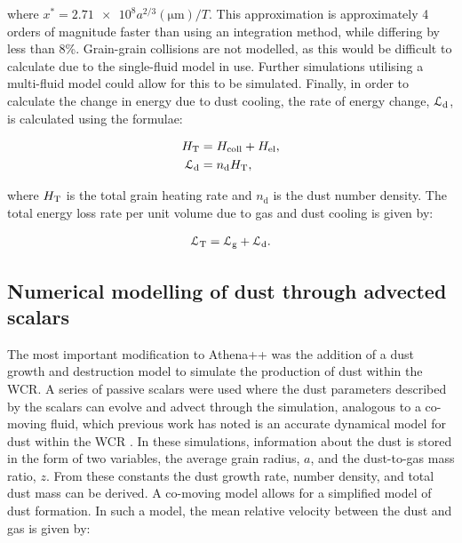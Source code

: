 \noindent
where $x^* = \num{2.71e8} a^{2/3} (\si{\micro\metre})/T$.
This approximation is approximately 4 orders of magnitude faster than using an integration method, while differing by less than 8\%.
Grain-grain collisions are not modelled, as this would be difficult to calculate due to the single-fluid model in use.
Further simulations utilising a multi-fluid model could allow for this to be simulated.
Finally, in order to calculate the change in energy due to dust cooling, the rate of energy change, $\mathcal{L}_\text{d}$, is calculated using the formulae:

\begin{subequations}
  \label{eq:transparency-approximation}
  \begin{align}
    H_\text{T}           & = H_\text{coll} + H_\text{el} , \\
    \mathcal{L}_\text{d} & = n_\text{d} H_\text{T} ,
  \end{align}
\end{subequations}

\noindent
where $H_\text{T}$ is the total grain heating rate
and $n_\text{d}$ is the dust number density.
The total energy loss rate per unit volume due to gas and dust cooling is given by:

\begin{equation}
	\mathcal{L}_\text{T} = \mathcal{L}_\text{g} + \mathcal{L}_\text{d} .
\end{equation}


\subsection{Numerical modelling of dust through advected scalars}

The most important modification to Athena++ was the addition of a dust growth and destruction model to simulate the production of dust within the WCR.
A series of passive scalars were used where the dust parameters described by the scalars can evolve and advect through the simulation, analogous to a co-moving fluid, which previous work has noted is an accurate dynamical model for dust within the WCR \parencite{hendrix_pinwheels_2016}.
In these simulations, information about the dust is stored in the form of two variables, the average grain radius, $a$, and the dust-to-gas mass ratio, $z$.
From these constants the dust growth rate, number density, and total dust mass can be derived.
A co-moving model allows for a simplified model of dust formation. In such a model, the mean relative velocity between the dust and gas is given by:

